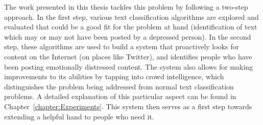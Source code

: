 The work presented in this thesis tackles this problem by following a two-step approach. In the first step, various text classification algorithms are explored and evaluated that could be a good fit for the problem at hand (identification of text which may or may not have been posted by a depressed person). In the second step, these algorithms are used to build a system that proactively looks for content on the Internet (on places like Twitter), and identifies people who have been posting emotionally distressed content. The system also allows for making improvements to its abilities by tapping into crowd intelligence, which distinguishes the problem being addressed from normal text classification problems. A detailed explanation of this particular aspect can be found in Chapter~\ref{chapter:Experiments}. This system then serves as a first step towards extending a helpful hand to people who need it.
